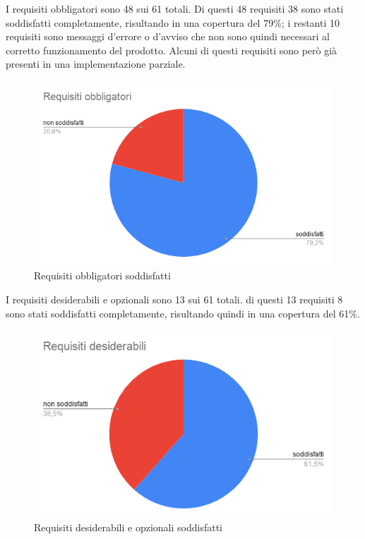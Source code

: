 I requisiti obbligatori sono 48 sui 61 totali. Di questi 48 requisiti 38 sono stati soddisfatti completamente, risultando in una copertura del 79\%; i restanti 10 requisiti sono messaggi d'errore o d'avviso che non sono quindi necessari al corretto funzionamento del prodotto. Alcuni di questi requisiti sono però già presenti in una implementazione parziale.
\begin{figure}[H]
\centering
\includegraphics[scale=0.75]{img/grafici/Requisiti_obbligatori.png}
\caption{Requisiti obbligatori soddisfatti}
\end{figure}

I requisiti desiderabili e opzionali sono 13 sui 61 totali. di questi 13 requisiti 8 sono stati soddisfatti completamente, risultando quindi in una copertura del 61\%.
\begin{figure}[H]
\centering
\includegraphics[scale=0.75]{img/grafici/Requisiti_desiderabili.png}
\caption{Requisiti desiderabili e opzionali soddisfatti}
\end{figure}